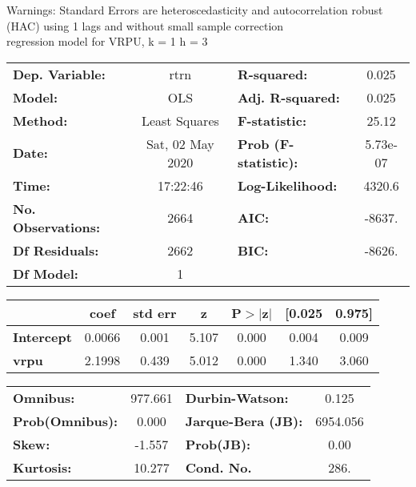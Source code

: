 Warnings: \newline
 [1] Standard Errors are heteroscedasticity and autocorrelation robust (HAC) using 1 lags and without small sample correction\\ 

regression model for VRPU, k = 1 h = 3\begin{center}
\begin{tabular}{lclc}
\toprule
\textbf{Dep. Variable:}    &       rtrn       & \textbf{  R-squared:         } &     0.025   \\
\textbf{Model:}            &       OLS        & \textbf{  Adj. R-squared:    } &     0.025   \\
\textbf{Method:}           &  Least Squares   & \textbf{  F-statistic:       } &     25.12   \\
\textbf{Date:}             & Sat, 02 May 2020 & \textbf{  Prob (F-statistic):} &  5.73e-07   \\
\textbf{Time:}             &     17:22:46     & \textbf{  Log-Likelihood:    } &    4320.6   \\
\textbf{No. Observations:} &        2664      & \textbf{  AIC:               } &    -8637.   \\
\textbf{Df Residuals:}     &        2662      & \textbf{  BIC:               } &    -8626.   \\
\textbf{Df Model:}         &           1      & \textbf{                     } &             \\
\bottomrule
\end{tabular}
\begin{tabular}{lcccccc}
                   & \textbf{coef} & \textbf{std err} & \textbf{z} & \textbf{P$> |$z$|$} & \textbf{[0.025} & \textbf{0.975]}  \\
\midrule
\textbf{Intercept} &       0.0066  &        0.001     &     5.107  &         0.000        &        0.004    &        0.009     \\
\textbf{vrpu}      &       2.1998  &        0.439     &     5.012  &         0.000        &        1.340    &        3.060     \\
\bottomrule
\end{tabular}
\begin{tabular}{lclc}
\textbf{Omnibus:}       & 977.661 & \textbf{  Durbin-Watson:     } &    0.125  \\
\textbf{Prob(Omnibus):} &   0.000 & \textbf{  Jarque-Bera (JB):  } & 6954.056  \\
\textbf{Skew:}          &  -1.557 & \textbf{  Prob(JB):          } &     0.00  \\
\textbf{Kurtosis:}      &  10.277 & \textbf{  Cond. No.          } &     286.  \\
\bottomrule
\end{tabular}
\end{center}

